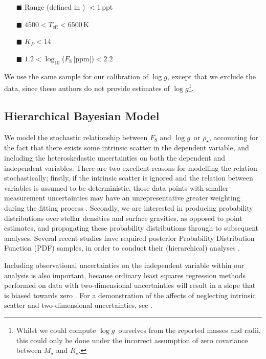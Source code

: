 \documentclass[apjl]{emulateapj}
\newcommand{\logg}{$\log g$}
\newcommand{\rhostar}{$\rho_{\star}$}
\begin{document}
\begin{itemize}
\item[{\tiny$\blacksquare$}] Range (defined in \citealt{bastien:2013})
$<1$\,ppt
\item[{\tiny$\blacksquare$}] $4500<T_{\mathrm{eff}}<6500$\,K
\item[{\tiny$\blacksquare$}] $K_P<14$
\item[{\tiny$\blacksquare$}] $1.2 < \log_{10}$($F_8$\,[ppm])$< 2.2$
\end{itemize}

We use the same sample for our calibration of \logg, except that we exclude the
\citet{huber:2013} data, since these authors do not provide estimates of
\logg\footnote{Whilst we could compute \logg\ ourselves from the reported
masses and radii, this could only be done under the incorrect assumption of
zero covariance between $M_{\star}$ and $R_{\star}$.}.

\subsection{Hierarchical Bayesian Model}

We model the stochastic relationship between $F_8$ and \logg\ or \rhostar,
accounting for the fact that there exists some intrinsic scatter in
the dependent variable, and including the heteroskedastic uncertainties on both
the dependent and independent variables.
There are two excellent reasons for modelling the relation stochastically;
firstly, if the intrinsic scatter is ignored and the relation between
variables is assumed to be deterministic, those data points with smaller
measurement uncertainties may have an unrepresentative greater weighting
during the fitting process \citep{hogg:2010b}.
Secondly, we are interested in producing probability distributions over stellar
densities and surface gravities, as opposed to point estimates, and propagating
these probability distributions through to subsequent analyses.
Several recent studies have required posterior Probability Distribution
Function (PDF) samples, in order to conduct their (hierarchical)
analyses \citep[e.g.][]{foreman-mackey:2014, rogers:2015, angus:2015}.

Including observational uncertainties on the independent variable within our
analysis is also important, because ordinary least squares regression methods
performed on data with two-dimensional uncertainties will result in a slope
that is biased towards zero
\citep[e.g.][]{fuller:1987, fox:1997}.
For a demonstration of the affects of neglecting intrinsic scatter and
two-dimensional uncertainties, see \citet{kelly:2007}.
\end{document}
